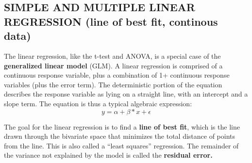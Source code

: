 \documentclass[]{article}
\newenvironment{Shaded}{\begin{snugshade}}{\end{snugshade}}
\newcommand{\KeywordTok}[1]{\textcolor[rgb]{0.13,0.29,0.53}{\textbf{#1}}}
\newcommand{\DataTypeTok}[1]{\textcolor[rgb]{0.13,0.29,0.53}{#1}}
\newcommand{\DecValTok}[1]{\textcolor[rgb]{0.00,0.00,0.81}{#1}}
\newcommand{\StringTok}[1]{\textcolor[rgb]{0.31,0.60,0.02}{#1}}
\newcommand{\CommentTok}[1]{\textcolor[rgb]{0.56,0.35,0.01}{\textit{#1}}}
\newcommand{\OperatorTok}[1]{\textcolor[rgb]{0.81,0.36,0.00}{\textbf{#1}}}
\newcommand{\NormalTok}[1]{#1}
\begin{document}
\begin{Shaded}
\end{Shaded}

\subsection{SIMPLE AND MULTIPLE LINEAR REGRESSION (line of best fit,
continous
data)}\label{simple-and-multiple-linear-regression-line-of-best-fit-continous-data}

The linear regression, like the t-test and ANOVA, is a special case of
the \textbf{generalized linear model} (GLM). A linear regression is
comprised of a continuous response variable, plus a combination of 1+
continuous response variables (plus the error term). The deterministic
portion of the equation describes the response variable as lying on a
straight line, with an intercept and a slope term. The equation is thus
a typical algebraic expression: \[ y = \alpha + \beta*x + \epsilon \]

The goal for the linear regression is to find a \textbf{line of best
fit}, which is the line drawn through the bivariate space that minimizes
the total distance of points from the line. This is also called a
``least squares'' regression. The remainder of the variance not
explained by the model is called the \textbf{residual error.}
\end{document}
